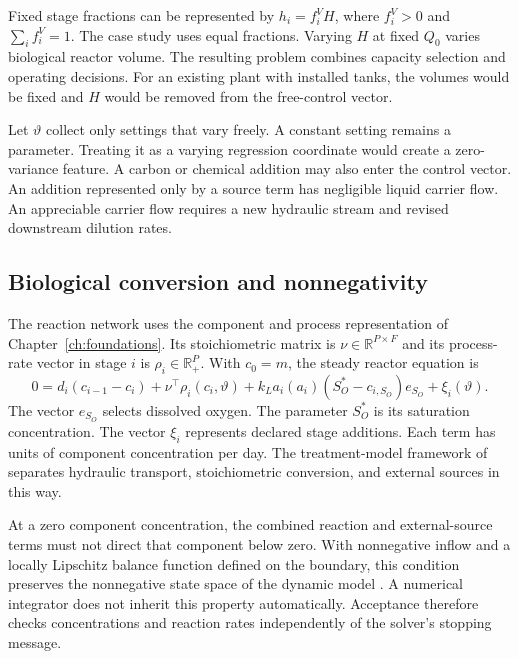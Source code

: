 Fixed stage fractions can be represented by $h_i=f_i^V H$, where $f_i^V>0$ and $\sum_i f_i^V=1$. The case study uses equal fractions. Varying $H$ at fixed $Q_0$ varies biological reactor volume. The resulting problem combines capacity selection and operating decisions. For an existing plant with installed tanks, the volumes would be fixed and $H$ would be removed from the free-control vector.

Let $\vartheta$ collect only settings that vary freely. A constant setting remains a parameter. Treating it as a varying regression coordinate would create a zero-variance feature. A carbon or chemical addition may also enter the control vector. An addition represented only by a source term has negligible liquid carrier flow. An appreciable carrier flow requires a new hydraulic stream and revised downstream dilution rates.

\subsection{Biological conversion and nonnegativity}

The reaction network uses the component and process representation of Chapter~\ref{ch:foundations}. Its stoichiometric matrix is $\nu\in\mathbb R^{P\times F}$ and its process-rate vector in stage $i$ is $\rho_i\in\mathbb R_+^P$. With $c_0=m$, the steady reactor equation is
\begin{equation}
0=d_i(c_{i-1}-c_i)+\nu^\top\rho_i(c_i,\vartheta)
+k_La_i(a_i)(S_O^*-c_{i,S_O})e_{S_O}+\xi_i(\vartheta).
\label{eq:plant_reactor}
\end{equation}
The vector $e_{S_O}$ selects dissolved oxygen. The parameter $S_O^*$ is its saturation concentration. The vector $\xi_i$ represents declared stage additions. Each term has units of component concentration per day. The treatment-model framework of \citet{Henze2006} separates hydraulic transport, stoichiometric conversion, and external sources in this way.

At a zero component concentration, the combined reaction and external-source terms must not direct that component below zero. With nonnegative inflow and a locally Lipschitz balance function defined on the boundary, this condition preserves the nonnegative state space of the dynamic model \citep{Haddad2010}. A numerical integrator does not inherit this property automatically. Acceptance therefore checks concentrations and reaction rates independently of the solver's stopping message.

